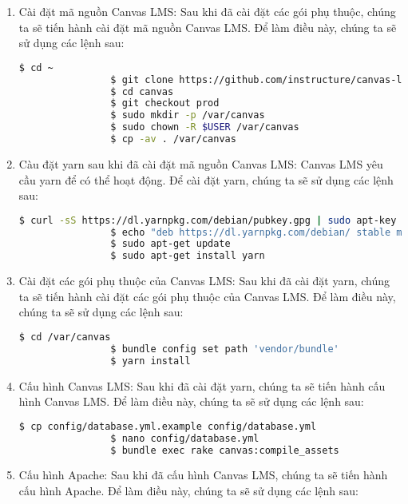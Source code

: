 \documentclass[../Thesis.tex]{subfiles}
\begin{document}
\begin{enumerate}
            \item Cài đặt mã nguồn Canvas LMS: Sau khi đã cài đặt các gói phụ thuộc, chúng ta sẽ tiến hành cài đặt mã nguồn Canvas LMS. Để làm điều này, chúng ta sẽ sử dụng các lệnh sau:
            \begin{lstlisting}[language=bash]
                $ cd ~
                $ git clone https://github.com/instructure/canvas-lms.git canvas
                $ cd canvas
                $ git checkout prod
                $ sudo mkdir -p /var/canvas
                $ sudo chown -R $USER /var/canvas
                $ cp -av . /var/canvas
            \end{lstlisting}

            \item Càu đặt yarn sau khi đã cài đặt mã nguồn Canvas LMS: Canvas LMS yêu cầu yarn để có thể hoạt động. Để cài đặt yarn, chúng ta sẽ sử dụng các lệnh sau:
            \begin{lstlisting}[language=bash]
                $ curl -sS https://dl.yarnpkg.com/debian/pubkey.gpg | sudo apt-key add -
                $ echo "deb https://dl.yarnpkg.com/debian/ stable main" | sudo tee /etc/apt/sources.list.d/yarn.list
                $ sudo apt-get update
                $ sudo apt-get install yarn
            \end{lstlisting}

            \item Cài đặt các gói phụ thuộc của Canvas LMS: Sau khi đã cài đặt yarn, chúng ta sẽ tiến hành cài đặt các gói phụ thuộc của Canvas LMS. Để làm điều này, chúng ta sẽ sử dụng các lệnh sau:
            \begin{lstlisting}[language=bash]
                $ cd /var/canvas
                $ bundle config set path 'vendor/bundle'
                $ yarn install
            \end{lstlisting}



            \item Cấu hình Canvas LMS: Sau khi đã cài đặt yarn, chúng ta sẽ tiến hành cấu hình Canvas LMS. Để làm điều này, chúng ta sẽ sử dụng các lệnh sau:
            \begin{lstlisting}[language=bash]
                $ cp config/database.yml.example config/database.yml
                $ nano config/database.yml
                $ bundle exec rake canvas:compile_assets
            \end{lstlisting}

            \item Cấu hình Apache: Sau khi đã cấu hình Canvas LMS, chúng ta sẽ tiến hành cấu hình Apache. Để làm điều này, chúng ta sẽ sử dụng các lệnh sau:


\end{enumerate}
\end{document}
